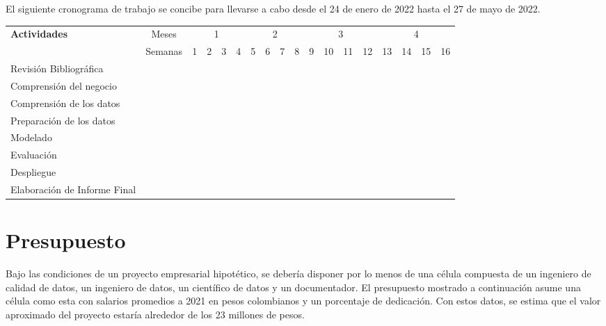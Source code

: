 \documentclass[11pt,letterpaper,oneside]{article}
\begin{document}
	El siguiente cronograma de trabajo se concibe para llevarse a cabo desde el 24 de enero de 2022 hasta el 27 de mayo de 2022.
	
	\begin{center}
	\centering
	\tiny 
	
	\begin{tabular}{ |l c|c|c|c|c|c|c|c|c|c|c|c|c|c|c|c|c| }
	 \hline
	 \textbf{Actividades} & Meses & 
	 \multicolumn{4}{c|}{1} & 
	 \multicolumn{4}{c|}{2} & 
	 \multicolumn{4}{c|}{3} & 
	 \multicolumn{4}{c|}{4} 
	 \\ \cline{3-18}
	 
	 & Semanas & 
	 1 & 2 & 3 & 4 & 5 & 6 & 7 & 8 & 9 & 10 & 11 & 12 & 13 & 14 & 15 & 16 
	 \\ \hline
	 
	 Revisión Bibliográfica & &
	 \multicolumn{2}{G|}{} & & & & & & & & & & & & & &
	 \\ \hline
	 
	Comprensión del negocio & &
	&& \multicolumn{1}{G|}{} & & & & & & & & & & & & & 
	\\ \hline
	 
	Comprensión de los datos & &
	 & & & \multicolumn{3}{G|}{} & & & & & & & & & & 
	\\ \hline
	
	Preparación de los datos & &
	& & & & & \multicolumn{3}{G|}{} & & & & & & & & 
	\\ \hline
	
	Modelado & &
	& & & & & & & \multicolumn{5}{G|}{} & & & &
	\\ \hline
	
	Evaluación & &
	& & & & & & & & & & & \multicolumn{3}{G|}{} & & 
	\\ \hline
	
	Despliegue & &
	& & & & & & & & & & & & & \multicolumn{2}{G|}{} &
	\\ \hline
	 
	Elaboración de Informe Final & &
	& & & & & & & & & & & & & & \multicolumn{2}{G|}{} 
	\\ \hline
	 
	\end{tabular}
	\end{center}
	
	\newpage
	
	\section{Presupuesto}
	Bajo las condiciones de un proyecto empresarial hipotético, se debería disponer por lo menos de una célula compuesta de un ingeniero de calidad de datos, un ingeniero de datos, un científico de datos y un documentador. El presupuesto mostrado a continuación asume una célula como esta con salarios promedios a 2021 en pesos colombianos y un porcentaje de dedicación. Con estos datos, se estima que el valor aproximado del proyecto estaría alrededor de los 23 millones de pesos.
	
\end{document}
